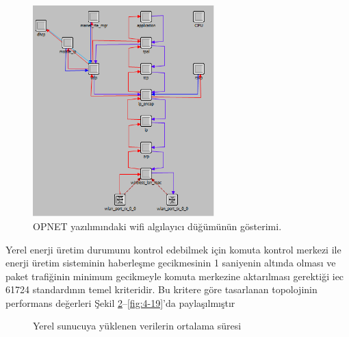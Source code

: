 \begin{figure}[htbp]
\centerline{\includegraphics[width=7cm]{Resim/PV-Sayfa -5.drawio.png}}
\caption{OPNET yazılımındaki \gls{wifi} algılayıcı düğümünün gösterimi.}
\label{fig:4-16}
\end{figure}


Yerel enerji üretim durumunu kontrol edebilmek için komuta kontrol merkezi ile enerji üretim sisteminin haberleşme gecikmesinin 1 saniyenin altında olması ve paket trafiğinin minimum gecikmeyle komuta merkezine aktarılması gerektiği \gls{iec} 61724 standardının temel kriteridir. Bu kritere göre tasarlanan topolojinin performans değerleri Şekil \ref{fig:4-17}--\ref{fig:4-19}’da paylaşılmıştır

\begin{figure}[htbp]

\centering




\caption{Yerel sunucuya yüklenen verilerin ortalama süresi}
\label{fig:4-17}
\end{figure}


